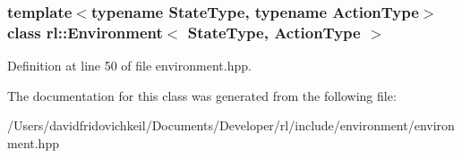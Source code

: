 \subsubsection*{template$<$typename State\+Type, typename Action\+Type$>$\newline
class rl\+::\+Environment$<$ State\+Type, Action\+Type $>$}



Definition at line 50 of file environment.\+hpp.



The documentation for this class was generated from the following file\+:\begin{DoxyCompactItemize}
\item 
/\+Users/davidfridovichkeil/\+Documents/\+Developer/rl/include/environment/environment.\+hpp\end{DoxyCompactItemize}
